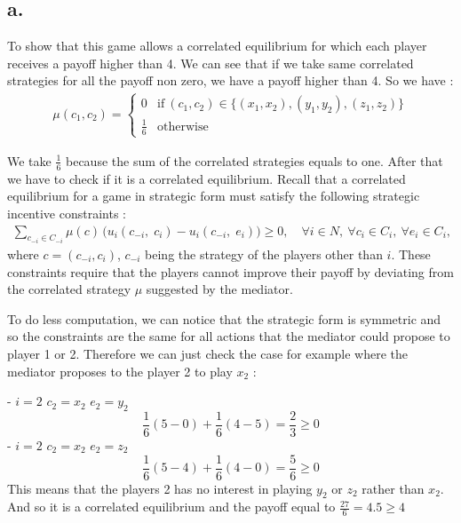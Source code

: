 \subsection*{a.}
To show that this game allows a correlated equilibrium for which each player receives a payoff higher than 4. We can see that if we take same correlated strategies for all the payoff non zero, we have a payoff higher than 4. So we have :
\begin{align*}
  \mu(c_1,c_2) =
    \begin{cases}
      0 & \mbox{if} \ (c_1,c_2) \in \{(x_1,x_2),(y_1,y_2),(z_1,z_2)\} \\
      \frac{1}{6} &\mbox{otherwise}
    \end{cases}
\end{align*}

We take $\frac{1}{6}$ because the sum of the correlated strategies equals to one. After that we have to check if it is a correlated equilibrium. Recall that a correlated equilibrium for a game in strategic form must satisfy the following strategic incentive constraints :
\begin{align*}
			\sum_{c_{-i} \in C_{-i}} \mu(c) \, \big( u_i(c_{-i}, \; c_i) - u_i(c_{-i}, \; e_i) \big) \geq 0, \quad \forall i \in N, \ \forall c_i \in C_i, \ \forall e_i \in C_i,
		\end{align*}
		where $c = (c_{-i}, c_i)$, $c_{-i}$ being the strategy of the players other than $i$. These constraints require that the players cannot improve their payoff by deviating from the correlated strategy $\mu$ suggested by the mediator.


To do less computation, we can notice that the strategic form is symmetric and so the constraints are the same for all actions that the mediator could propose to player 1 or 2. Therefore we can just check the case for example where the mediator proposes to the player 2 to play $x_2$ :

- $i=2$ $c_2=x_2$  $e_2=y_2$
\begin{equation*}  
\frac{1}{6}(5-0) + \frac{1}{6}(4-5) = \frac{2}{3} \ge 0 
\end{equation*}
- $i=2$ $c_2=x_2$  $e_2=z_2$
\begin{equation*} 
\frac{1}{6}(5-4) + \frac{1}{6}(4-0) = \frac{5}{6} \ge 0 
\end{equation*}
This means that the players 2 has no interest in playing $y_2$ or $z_2$ rather than $x_2$. And so it is a correlated equilibrium and the payoff equal to $\frac{27}{6} = 4.5 \ge 4$

